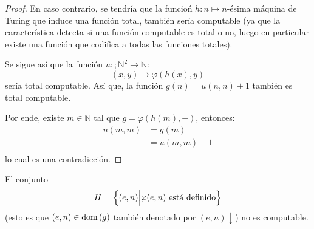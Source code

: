 \documentclass[12pt]{report}
\newcounter{it}
\theoremstyle{largebreak}
\newcommand\cf[3]{\ensuremath{#1:#2\rightarrow#3}}
\newcommand{\dom}[1]{\textup{dom}\left(#1 \right)}
\begin{document}
    \begin{proof}
        En caso contrario, se tendría que la funcioń $h:n\mapsto n$-ésima máquina de Turing que induce una función total, también sería computable (ya que la característica detecta si una función computable es total o no, luego en particular existe una función que codifica a todas las funciones totales).

        Se sigue así que la función $\cf{u}{;\mathbb{N}^2}{\mathbb{N}}$:
        \begin{equation*}
            (x,y)\mapsto \varphi(h(x),y)
        \end{equation*}
        sería total computable. Así que, la función $g(n)=u(n,n)+1$ también es total computable.

        Por ende, existe $m\in\mathbb{N}$ tal que $g=\varphi(h(m),-)$, entonces:
        \begin{equation*}
            \begin{split}
                u(m,m)&=g(m)\\
                &=u(m,m)+1\\
            \end{split}
        \end{equation*}
        lo cual es una contradicción.
    \end{proof}

    \begin{theor}
        El conjunto
        \begin{equation*}
            H=\left\{(e,n)\Big|\varphi(e,n)\textup{ está definido} \right\}
        \end{equation*}
        (esto es que $(e,n)\in\dom g$ también denotado por $(e,n)\downarrow$) no es computable.
    \end{theor}
\end{document}
